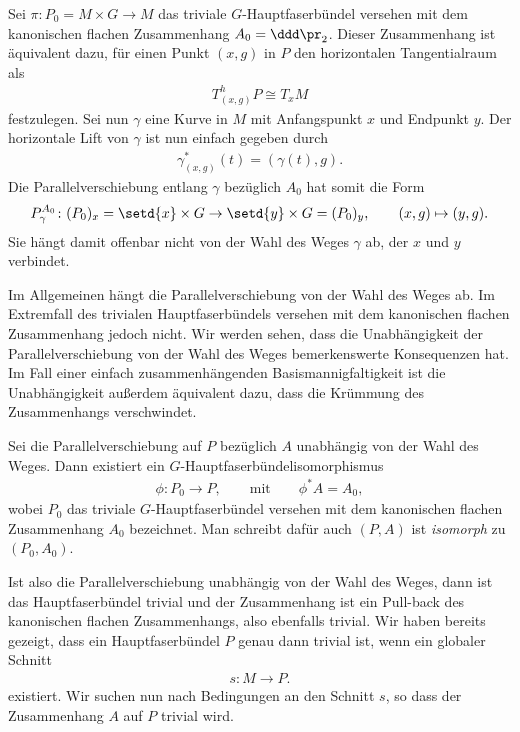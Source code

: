 \documentclass[%
	paper=a5,%
	fleqn,%
	DIV=18,%
	BCOR=0mm,
	fontsize=11pt,
	titlepage=false,%
	bibliography=totoc,
	DIV=18,%
	twoside=true,
	pdftitle=Riemannsche Geometrie,
	pdfauthor=Uwe Semmelmann,
	numbers=noendperiod]%
	{scrbook}
\begin{document}
\begin{ex}
\begin{exenum}
\item
\label{ex:Parallelverschiebung-unabhängig-kanonisch-flach}
Sei $\pi\colon P_0 = M\times G\to M$ das triviale $G$-Hauptfaserbündel versehen mit
dem kanonischen flachen Zusammenhang $A_0=\ddd \pr_2$. Dieser Zusammenhang ist
äquivalent dazu, für einen Punkt $(x,g)$ in $P$ den horizontalen Tangentialraum
als
\begin{align*}
T_{(x,g)}^hP \cong T_xM
\end{align*}
festzulegen. Sei nun $\gamma$ eine Kurve in $M$ mit Anfangspunkt $x$ und
Endpunkt $y$. Der horizontale Lift von $\gamma$ ist nun einfach gegeben durch
\begin{align*}
\gamma_{(x,g)}^*(t) = (\gamma(t),g).
\end{align*}
Die Parallelverschiebung entlang $\gamma$ bezüglich $A_0$ hat somit die Form
\begin{align*}
P_\gamma^{A_0} \colon (P_0)_x = \setd{x}\times G\to \setd{y}\times G = (P_0)_y,\qquad
(x,g) \mapsto (y,g).
\end{align*}
Sie hängt damit offenbar nicht von der Wahl des Weges $\gamma$ ab, der $x$ und
$y$ verbindet.\boxc
\end{exenum}
\end{ex}

Im Allgemeinen hängt die Parallelverschiebung von der Wahl des Weges ab. Im
Extremfall des trivialen Hauptfaserbündels versehen mit dem kanonischen flachen
Zusammenhang jedoch nicht. Wir werden sehen, dass die Unabhängigkeit der
Parallelverschiebung von der Wahl des Weges bemerkenswerte Konsequenzen hat.
Im Fall einer einfach zusammenhängenden Basismannigfaltigkeit ist die
Unabhängigkeit außerdem äquivalent dazu, dass die Krümmung des Zusammenhangs
verschwindet.

\begin{prop}
Sei die Parallelverschiebung auf $P$ bezüglich $A$ unabhängig von der Wahl des
Weges. Dann existiert ein $G$-Hauptfaserbündelisomorphismus
\begin{align*}
\phi\colon P_0\to P,\qquad \text{mit}\qquad \phi^* A = A_0,
\end{align*}
wobei $P_0$ das triviale $G$-Hauptfaserbündel versehen mit dem kanonischen
flachen Zusammenhang $A_0$ bezeichnet. Man schreibt dafür auch $(P,A)$ ist
\emph{isomorph} zu $(P_0,A_0)$.\fish
\end{prop}

Ist also die Parallelverschiebung unabhängig von der Wahl des Weges, dann ist
das Hauptfaserbündel trivial und der Zusammenhang ist ein Pull-back des
kanonischen flachen Zusammenhangs, also ebenfalls trivial. Wir haben bereits
gezeigt, dass ein Hauptfaserbündel $P$ genau dann trivial ist, wenn ein
globaler Schnitt
\begin{align*}
s: M\to P.
\end{align*}
existiert. Wir suchen nun nach Bedingungen an den Schnitt $s$, so dass der
Zusammenhang $A$ auf $P$ trivial wird.
\end{document}
